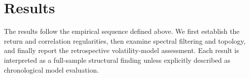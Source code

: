 \documentclass[a4paper,fleqn]{cas-sc}
\begin{document}






\section{Results}
\label{sec:results}
The results follow the empirical sequence defined above. We first establish the return and correlation regularities, then examine spectral filtering and topology, and finally report the retrospective volatility-model assessment. Each result is interpreted as a full-sample structural finding unless explicitly described as chronological model evaluation.










\appendix




\FloatBarrier

\printcredits



\end{document}
